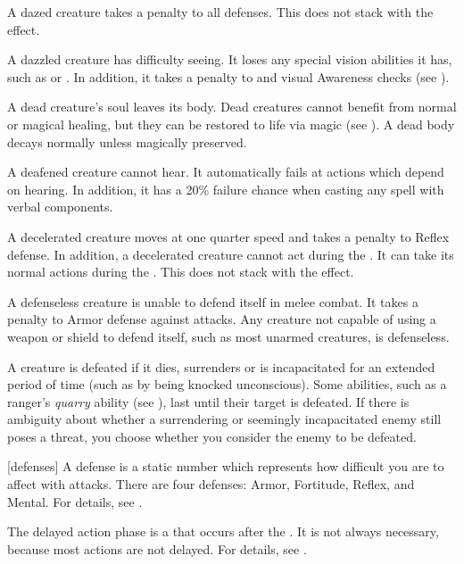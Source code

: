  A dazed creature takes a  penalty to all defenses.
This does not stack with the  effect.

 A dazzled creature has difficulty seeing.
It loses any special vision abilities it has, such as  or .
In addition, it takes a  penalty to  and visual Awareness checks (see ).

 A dead creature's soul leaves its body. Dead creatures cannot benefit from normal or magical healing, but they can be restored to life via magic (see ). A dead body decays normally unless magically preserved.

 A deafened creature cannot hear. It automatically fails at actions which depend on hearing. In addition, it has a 20\% failure chance when casting any spell with verbal components.

 A decelerated creature moves at one quarter speed and takes a  penalty to Reflex defense.
In addition, a decelerated creature cannot act during the .
It can take its normal actions during the .
This does not stack with the  effect.

 A defenseless creature is unable to defend itself in melee combat.
It takes a  penalty to Armor defense against  attacks.
Any creature not capable of using a weapon or shield to defend itself, such as most unarmed creatures, is defenseless.

 A creature is defeated if it dies, surrenders or is incapacitated for an extended period of time (such as by being knocked unconscious).
Some abilities, such as a ranger's \textit{quarry} ability (see ), last until their target is defeated.
If there is ambiguity about whether a surrendering or seemingly incapacitated enemy still poses a threat, you choose whether you consider the enemy to be defeated.

[defenses] A defense is a static number which represents how difficult you are to affect with attacks.
There are four defenses: Armor, Fortitude, Reflex, and Mental.
For details, see .

 The delayed action phase is a  that occurs after the .
It is not always necessary, because most actions are not delayed.
For details, see .

